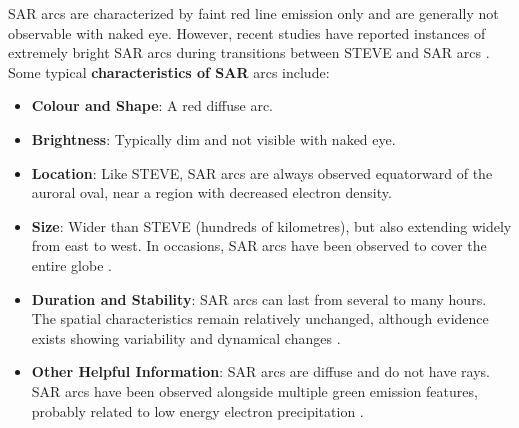 \documentclass{article}
\renewcommand{\cite}[1]{\parencite{#1}}
\begin{document}
SAR arcs are characterized by faint red line emission only and are generally not observable with naked eye. However, recent studies have reported instances of extremely bright SAR arcs during transitions between STEVE and SAR arcs \cite{Martinis2022}. Some typical {\bf characteristics of SAR} arcs include:

\begin{itemize}
\item {\bf Colour and Shape}: A red diffuse arc.
\item {\bf Brightness}: Typically dim and not visible with naked eye.
\item {\bf Location}: Like STEVE, SAR arcs are always observed equatorward of the auroral oval, near a region with decreased electron density.
\item {\bf Size}: Wider than STEVE (hundreds of kilometres), but also extending widely from east to west. In occasions, SAR arcs have been observed to cover the entire globe \cite{Mendillo2013}.
\item {\bf Duration and Stability}: SAR arcs can last from several to many hours. The spatial characteristics remain relatively unchanged, although evidence exists showing variability and dynamical changes \cite{Mendillo_2016a}.
\item {\bf Other Helpful Information}: SAR arcs are diffuse and do not have rays. SAR arcs have been observed alongside multiple green emission features, probably related to low energy electron precipitation \cite{Mendillo_2016a}.
\end{itemize}
\end{document}
